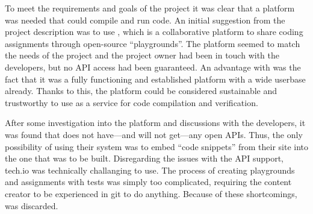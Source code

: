 To meet the requirements and goals of the project it was clear that a platform was needed that could compile and run code. An initial suggestion from the project description was to use \techio{}, which is a collaborative platform to share coding assignments through open-source ``playgrounds''. The platform seemed to match the needs of the project and the project owner had been in touch with the developers, but no API access had been guaranteed. An advantage with \techio{} was the fact that it was a fully functioning and established platform with a wide userbase already. Thanks to this, the platform could be considered sustainable and trustworthy to use as a service for code compilation and verification.

After some investigation into the platform and discussions with the developers, it was found that \techio{} does not have---and will not get---any open APIs. Thus, the only possibility of using their system was to  embed ``code snippets'' from their site into the one that was to be built. Disregarding the issues with the API support, tech.io was technically challanging to use. The process of creating playgrounds and assignments with tests was simply too complicated, requiring the content creator to be experienced in git to do anything. Because of these shortcomings, \techio{} was discarded.\\

